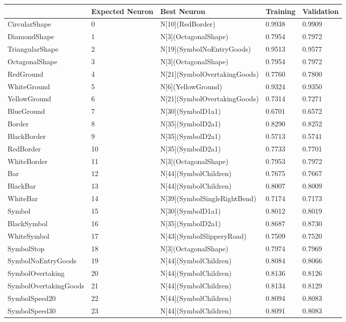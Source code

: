 \begin{tabular}{lllll}
\toprule
 & Expected Neuron & Best Neuron & Training & Validation \\
\midrule
CircularShape & 0 & N[10](RedBorder) & 0.9938 & 0.9909 \\
DiamondShape & 1 & N[3](OctagonalShape) & 0.7954 & 0.7972 \\
TriangularShape & 2 & N[19](SymbolNoEntryGoods) & 0.9513 & 0.9577 \\
OctagonalShape & 3 & N[3](OctagonalShape) & 0.7954 & 0.7972 \\
RedGround & 4 & N[21](SymbolOvertakingGoods) & 0.7760 & 0.7800 \\
WhiteGround & 5 & N[6](YellowGround) & 0.9324 & 0.9350 \\
YellowGround & 6 & N[21](SymbolOvertakingGoods) & 0.7314 & 0.7271 \\
BlueGround & 7 & N[30](SymbolD1a1) & 0.6701 & 0.6572 \\
Border & 8 & N[35](SymbolD2a1) & 0.8290 & 0.8252 \\
BlackBorder & 9 & N[35](SymbolD2a1) & 0.5713 & 0.5741 \\
RedBorder & 10 & N[35](SymbolD2a1) & 0.7733 & 0.7701 \\
WhiteBorder & 11 & N[3](OctagonalShape) & 0.7953 & 0.7972 \\
Bar & 12 & N[44](SymbolChildren) & 0.7675 & 0.7667 \\
BlackBar & 13 & N[44](SymbolChildren) & 0.8007 & 0.8009 \\
WhiteBar & 14 & N[39](SymbolSingleRightBend) & 0.7174 & 0.7173 \\
Symbol & 15 & N[30](SymbolD1a1) & 0.8012 & 0.8019 \\
BlackSymbol & 16 & N[35](SymbolD2a1) & 0.8687 & 0.8730 \\
WhiteSymbol & 17 & N[43](SymbolSlipperyRoad) & 0.7509 & 0.7520 \\
SymbolStop & 18 & N[3](OctagonalShape) & 0.7974 & 0.7969 \\
SymbolNoEntryGoods & 19 & N[44](SymbolChildren) & 0.8084 & 0.8066 \\
SymbolOvertaking & 20 & N[44](SymbolChildren) & 0.8136 & 0.8126 \\
SymbolOvertakingGoods & 21 & N[44](SymbolChildren) & 0.8134 & 0.8129 \\
SymbolSpeed20 & 22 & N[44](SymbolChildren) & 0.8094 & 0.8083 \\
SymbolSpeed30 & 23 & N[44](SymbolChildren) & 0.8091 & 0.8083 \\

\end{tabular}
